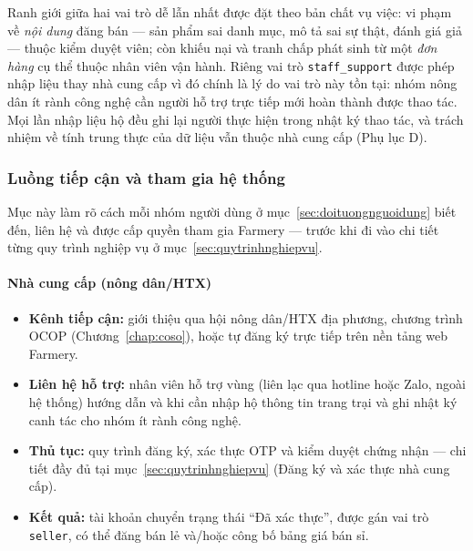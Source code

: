 \noindent Ranh giới giữa hai vai trò dễ lẫn nhất được đặt theo bản chất vụ việc: vi phạm về \emph{nội dung} đăng bán --- sản phẩm sai danh mục, mô tả sai sự thật, đánh giá giả --- thuộc kiểm duyệt viên; còn khiếu nại và tranh chấp phát sinh từ một \emph{đơn hàng} cụ thể thuộc nhân viên vận hành. Riêng vai trò \texttt{staff\_support} được phép nhập liệu thay nhà cung cấp vì đó chính là lý do vai trò này tồn tại: nhóm nông dân ít rành công nghệ cần người hỗ trợ trực tiếp mới hoàn thành được thao tác. Mọi lần nhập liệu hộ đều ghi lại người thực hiện trong nhật ký thao tác, và trách nhiệm về tính trung thực của dữ liệu vẫn thuộc nhà cung cấp (Phụ lục D).

\subsubsection*{Luồng tiếp cận và tham gia hệ thống}
\label{sec:luongtiepcan}

Mục này làm rõ cách mỗi nhóm người dùng ở mục~\ref{sec:doituongnguoidung} biết đến, liên hệ và được cấp quyền tham gia Farmery --- trước khi đi vào chi tiết từng quy trình nghiệp vụ ở mục~\ref{sec:quytrinhnghiepvu}.

\paragraph*{Nhà cung cấp (nông dân/HTX)}
\begin{itemize}
    \item \textbf{Kênh tiếp cận:} giới thiệu qua hội nông dân/HTX địa phương, chương trình OCOP (Chương~\ref{chap:coso}), hoặc tự đăng ký trực tiếp trên nền tảng web Farmery.
    \item \textbf{Liên hệ hỗ trợ:} nhân viên hỗ trợ vùng (liên lạc qua hotline hoặc Zalo, ngoài hệ thống) hướng dẫn và khi cần nhập hộ thông tin trang trại và ghi nhật ký canh tác cho nhóm ít rành công nghệ.
    \item \textbf{Thủ tục:} quy trình đăng ký, xác thực OTP và kiểm duyệt chứng nhận --- chi tiết đầy đủ tại mục~\ref{sec:quytrinhnghiepvu} (Đăng ký và xác thực nhà cung cấp).
    \item \textbf{Kết quả:} tài khoản chuyển trạng thái ``Đã xác thực'', được gán vai trò \texttt{seller}, có thể đăng bán lẻ và/hoặc công bố bảng giá bán sỉ.
\end{itemize}

